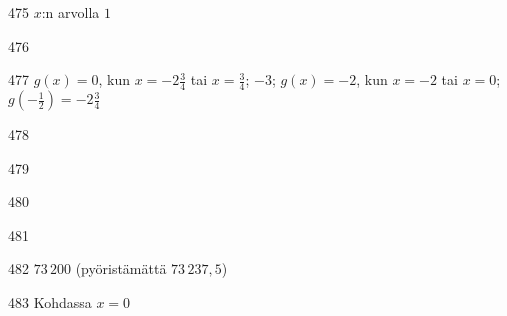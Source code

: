 \begin{Vastaus}{475}
$x$:n arvolla $1$
	
\end{Vastaus}
\begin{Vastaus}{476}
  
\end{Vastaus}
\begin{Vastaus}{477}
	$g(x)=0$, kun $x=-2\frac{3}{4}$ tai $x=\frac{3}{4}$; $-3$; $g(x)=-2$, kun $x=-2$ tai $x=0$; $g\left(-\frac{1}{2}\right)=-2\frac{3}{4}$
	
\end{Vastaus}
\begin{Vastaus}{478}
	
\end{Vastaus}
\begin{Vastaus}{479}
	
\end{Vastaus}
\begin{Vastaus}{480}
	
\end{Vastaus}
\begin{Vastaus}{481}
\end{Vastaus}
\begin{Vastaus}{482}
	$73\,200$ (pyöristämättä $73\,237,5$)
	
\end{Vastaus}
\begin{Vastaus}{483}
Kohdassa $x=0$
\end{Vastaus}
